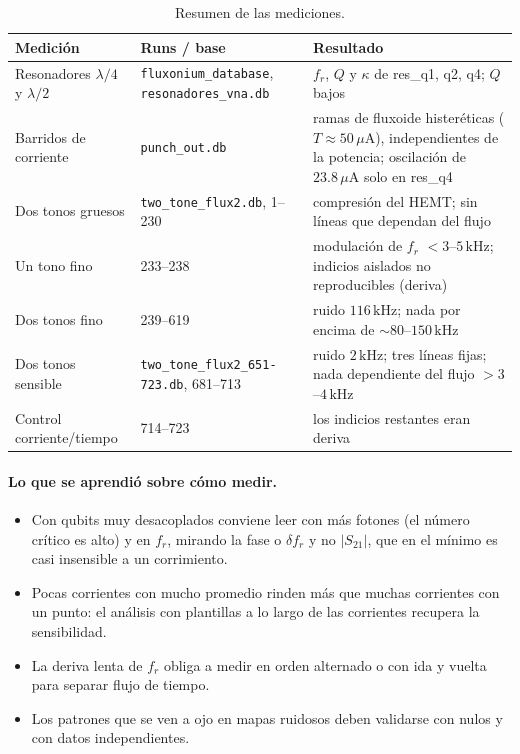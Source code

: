 \documentclass[11pt,a4paper]{article}
\newcommand{\uA}{\,\mu\mathrm{A}}
\newcommand{\kHz}{\,\mathrm{kHz}}
\newcommand{\fr}{f_r}
\newcommand{\dfr}{\delta\!f_r}
\begin{document}
\begin{table}[H]
\centering
\small
\begin{tabularx}{\textwidth}{l l X}
\toprule
Medición & Runs / base & Resultado \\
\midrule
Resonadores $\lambda/4$ y $\lambda/2$ & \texttt{fluxonium\_database}, \texttt{resonadores\_vna.db} & $\fr$, $Q$ y $\kappa$ de res\_q1, q2, q4; $Q$ bajos \\
Barridos de corriente & \texttt{punch\_out.db} & ramas de fluxoide histeréticas ($T\approx50\uA$), independientes de la potencia; oscilación de $23.8\uA$ solo en res\_q4 \\
Dos tonos gruesos & \texttt{two\_tone\_flux2.db}, 1--230 & compresión del HEMT; sin líneas que dependan del flujo \\
Un tono fino & 233--238 & modulación de $\fr$ $<3$--$5\kHz$; indicios aislados no reproducibles (deriva) \\
Dos tonos fino & 239--619 & ruido $116\kHz$; nada por encima de $\sim 80$--$150\kHz$ \\
Dos tonos sensible & \texttt{two\_tone\_flux2\_651-723.db}, 681--713 & ruido $2\kHz$; tres líneas fijas; nada dependiente del flujo $>3$--$4\kHz$ \\
Control corriente/tiempo & 714--723 & los indicios restantes eran deriva \\
\bottomrule
\end{tabularx}
\caption{Resumen de las mediciones.}
\end{table}

\paragraph{Lo que se aprendió sobre cómo medir.}
\begin{itemize}
  \item Con qubits muy desacoplados conviene leer con más fotones (el número crítico es alto) y en $\fr$, mirando la
    fase o $\dfr$ y no $|S_{21}|$, que en el mínimo es casi insensible a un corrimiento.
  \item Pocas corrientes con mucho promedio rinden más que muchas corrientes con un punto: el análisis con plantillas
    a lo largo de las corrientes recupera la sensibilidad.
  \item La deriva lenta de $\fr$ obliga a medir en orden alternado o con ida y vuelta para separar flujo de tiempo.
  \item Los patrones que se ven a ojo en mapas ruidosos deben validarse con nulos y con datos independientes.
\end{itemize}
\end{document}
